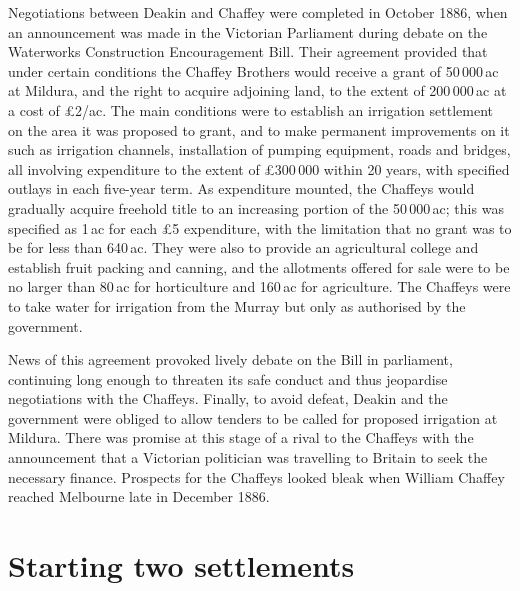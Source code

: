 Negotiations between Deakin and Chaffey were completed in October
1886, when an announcement was made in the Victorian Parliament during
debate on the Waterworks Construction Encouragement Bill.  Their
agreement provided that under certain conditions the Chaffey Brothers
would receive a grant of 50\,000\,ac at Mildura, and the right to
acquire adjoining land, to the extent of 200\,000\,ac at a cost of
\pounds2/ac.  The main conditions were to establish an irrigation
settlement on the area it was proposed to grant, and to make permanent
improvements on it such as irrigation channels, installation of
pumping equipment, roads and bridges, all involving expenditure to the
extent of \pounds300\,000 within 20 years, with specified outlays in
each five-year term.  As expenditure mounted, the Chaffeys would
gradually acquire freehold title to an increasing portion of the
50\,000\,ac; this was specified as 1\,ac for each \pounds5
expenditure, with the limitation that no grant was to be for less than
640\,ac.  They were also to
provide an agricultural college and establish fruit packing and
canning, and the allotments offered for sale were to be no larger than
80\,ac for horticulture and 160\,ac for
agriculture. The Chaffeys were to
take water for irrigation from the Murray but only as authorised by
the government.

News of this agreement provoked lively debate on the Bill in
parliament, continuing long enough to threaten its safe conduct and
thus jeopardise negotiations with the Chaffeys.  Finally, to avoid
defeat, Deakin and the government were obliged to allow tenders to be
called for proposed irrigation at Mildura.  There was promise at this
stage of a rival to the Chaffeys with the announcement that a
Victorian politician was travelling to Britain to seek the necessary
finance.  Prospects for the Chaffeys looked bleak when William Chaffey
reached Melbourne late in December 1886.

\section*{Starting two settlements}

